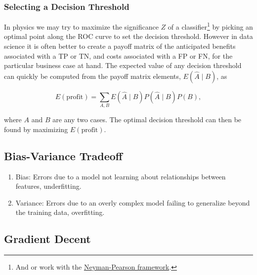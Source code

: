 \subsubsection{Selecting a Decision Threshold}
\label{ml:general:eval:decision_threshold}


In physics we may try to maximize the significance $Z$ of a classifier\footnote{And or
work with the \href{https://en.wikipedia.org/wiki/Neyman\%E2\%80\%93Pearson\_lemma}{Neyman-Pearson framework}.} by
picking an optimal point along the ROC curve to set the decision threshold.
However in data science it is often better to create a payoff matrix of the anticipated
benefits associated with a TP or TN, and costs associated with a FP or FN,
for the particular business case at hand.
The expected value of any decision threshold can quickly be computed
from the payoff matrix elements, $E\left( \hat{A} \mid B\right)$, as

\begin{equation} \label{eq:E_profit}
E\left(\text{profit}\right) = \sum_{A,B} E\left( \hat{A} \mid B\right) P\left(\hat{A} \mid B \right) P\left(B\right),
\end{equation}

\noindent where $A$ and $B$ are any two cases.
The optimal decision threshold can then be found by maximizing $E\left(\text{profit}\right)$.

\subsection{Bias-Variance Tradeoff}
\label{ml:general:biasVar}

\begin{enumerate}[noitemsep]
\item Bias: Errors due to a model not learning about relationships between features, \ie underfitting.
\item Variance: Errors due to an overly complex model failing to generalize beyond the training data, \ie overfitting.
\end{enumerate}

\subsection{Gradient Decent}
\label{ml:general:gradDec}

